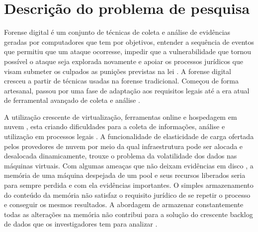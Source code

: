 \documentclass[12pt,				%
	openright,			%
	oneside,			%
	a4paper,			%
	english,			%
	brazil				%
	]{abntex2}
\begin{document}




\textual

\chapter{Descrição do problema de pesquisa} \label{chap:intro}
%
Forense digital é um conjunto de técnicas de coleta e análise de evidências geradas por computadores que tem por objetivos, entender a sequência de eventos que permitiu que um 
ataque ocorresse, impedir que a vulnerabilidade que tornou possível o ataque seja explorada novamente e apoiar os processos jurídicos que visam submeter os culpados as punições
previstas na lei \cite{Sang2013}. 
A forense digital cresceu a partir de técnicas usadas na forense tradicional. Começou de forma artesanal, passou por uma fase de adaptação aos requisitos legais até a era atual
de ferramental avançado de coleta e análise \cite{Charters2008}.

A utilização crescente de virtualização, ferramentas online e hospedagem em nuvem \cite{Amazon2016}, esta criando dificuldades para a coleta de informações, análise e utilização 
em processos legais \cite{Sharma2012}. A funcionalidade de elasticidade de carga ofertada pelos provedores de nuvem por meio da qual infraestrutura pode ser 
alocada e desalocada dinamicamente, trouxe o problema da volatilidade dos dados nas máquinas virtuais. Com algumas ameaças que não deixam evidências em disco \cite{Rafique2013}, 
a memória de uma máquina despejada de um pool e seus recursos liberados seria para sempre perdida e com ela evidências importantes. O simples armazenamento do conteúdo da memória
não satisfaz o requisito jurídico de se repetir o processo e conseguir os mesmos resultados. A abordagem de armazenar constantemente todas as alterações na memória não contribui 
para a solução do crescente backlog de dados que os investigadores tem para analizar \cite{Quick2014}. 
\end{document}
